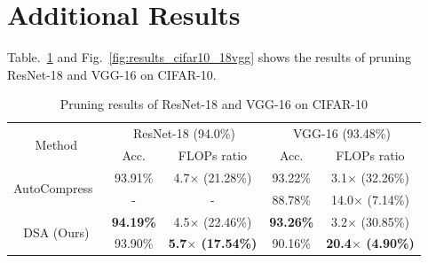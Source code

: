 \documentclass[runningheads]{llncs}
\begin{document}
  
  \section{Additional Results}
  
  Table.~\ref{tab:res_cifar10_18} and Fig.~\ref{fig:results_cifar10_18vgg} shows the results of pruning ResNet-18 and VGG-16 on CIFAR-10.

  \addtolength{\tabcolsep}{1pt}
  \begin{table}[h]
  \caption{Pruning results of ResNet-18 and VGG-16 on CIFAR-10}
  \label{tab:res_cifar10_18}
  \begin{center}
    \begin{tabular}{c@{\hskip 0.02\linewidth}cccc}
      \toprule
  \multirow{2}{*}{Method} & \multicolumn{2}{c}{ResNet-18 (94.0\%)} & \multicolumn{2}{c}{VGG-16 (93.48\%)} \\\cmidrule(lr){2-3}\cmidrule(lr){4-5} 
                          & Acc.            & FLOPs ratio          & Acc.       & FLOPs ratio      \\\midrule
  \multirow{2}{*}{AutoCompress~\cite{autocompress}}      & 93.91\%         & 4.7$\times$ (21.28\%)        & 93.22\%    &
  3.1$\times$ (32.26\%)    \\
    & -       &  -       & 88.78\%   &  14.0$\times$ (7.14\%) \\\cmidrule(lr){1-5} 
  \multirow{2}{*}{DSA (Ours)}               & {\bf 94.19\%}           & 4.5$\times$ (22.46\%)        &  {\bf 93.26\%}    & 3.2$\times$ (30.85\%)             \\
            & 93.90\%          &  {\bf 5.7$\times$ (17.54\%)}     &  90.16\%    &     {\bf 20.4$\times$ (4.90\%)}   \\\bottomrule
  \end{tabular}
  \end{center}
  \end{table}
  \addtolength{\tabcolsep}{-1pt}
  
\end{document}
